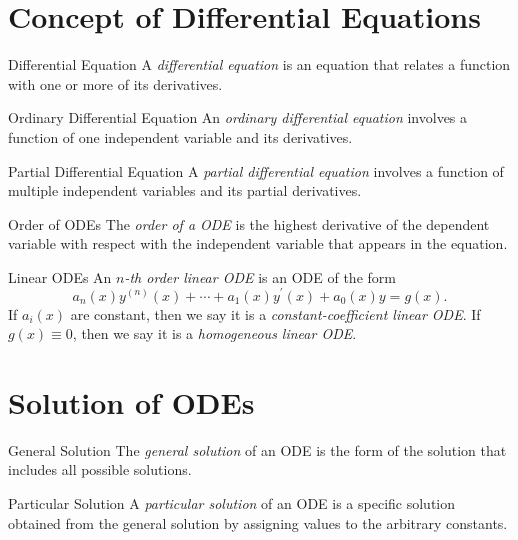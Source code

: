 
\section{Concept of Differential Equations}

\begin{definition}{Differential Equation}{}
  A \emph{differential equation} is an equation that relates a function
  with one or more of its derivatives.
\end{definition}

\begin{definition}{Ordinary Differential Equation}{}
  An \emph{ordinary differential equation} involves a function
  of one independent variable and its derivatives.
\end{definition}

\begin{definition}{Partial Differential Equation}{}
  A \emph{partial differential equation} involves a function of
  multiple independent variables and its partial derivatives.
\end{definition}

\begin{definition}{Order of ODEs}{}
  The \emph{order of a ODE} is the highest derivative of the dependent variable
  with respect with the independent variable that appears in the equation.
\end{definition}

\begin{definition}{Linear ODEs}{}
  An \emph{$n$-th order linear ODE} is an ODE of the form
  \begin{equation}
    a_n(x)y^{(n)}(x) + \cdots + a_1(x)y^{\prime}(x) + a_0(x)y = g(x).
  \end{equation}
  If $a_i(x)$ are constant, then we say it is a \emph{constant-coefficient linear ODE}.
  If $g(x) \equiv 0$, then we say it is a \emph{homogeneous linear ODE}.
\end{definition}

\section{Solution of ODEs}

\begin{definition}{General Solution}{}
  The \emph{general solution} of an ODE is the form of the solution that includes all possible solutions.
\end{definition}

\begin{definition}{Particular Solution}{}
  A \emph{particular solution} of an ODE is a specific solution obtained from the general solution
  by assigning values to the arbitrary constants.
\end{definition}


